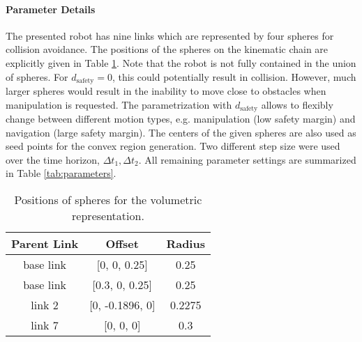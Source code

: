 \paragraph{Parameter Details}%
\label{par:parameter_details}
%
The presented robot has nine links which are represented by four spheres for collision avoidance. The positions of the spheres on the kinematic chain are explicitly given in Table
\ref{tab:spheres}. Note that the robot is not fully contained in the union of spheres. For
$d_{\textrm{safety}} = 0$, this could potentially result in collision. However, much
larger spheres would result in the inability to move close to obstacles when manipulation
is requested. The parametrization with $d_{\textrm{safety}}$ allows to flexibly change
between different motion types, e.g. manipulation (low safety margin) and navigation
(large safety margin). The centers of the given spheres are also used as seed points
for the convex region
generation. Two different step size were used over the time horizon, $\Delta t_1, \Delta t_2$. All remaining parameter settings are summarized in Table
\ref{tab:parameters}. 
%
\begin{table}[!t]
  \centering
  \caption{Positions of spheres for the volumetric representation.}
  \label{tab:spheres}
  \begin{tabular}{|c|c|c|}
    \hline
    Parent Link & Offset & Radius \\
    \hline
    base link & [0, 0, 0.25] & 0.25 \\
    \hline
    base link & [0.3, 0, 0.25] & 0.25 \\
    \hline
    link 2 & [0, -0.1896, 0] & 0.2275 \\
    \hline
    link 7 & [0, 0, 0] & 0.3 \\
    \hline
  \end{tabular}
\end{table}
%
